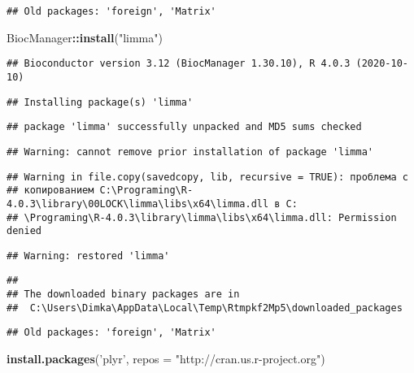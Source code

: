 \documentclass[
]{article}
\newenvironment{Shaded}{\begin{snugshade}}{\end{snugshade}}
\newcommand{\DataTypeTok}[1]{\textcolor[rgb]{0.13,0.29,0.53}{#1}}
\newcommand{\KeywordTok}[1]{\textcolor[rgb]{0.13,0.29,0.53}{\textbf{#1}}}
\newcommand{\NormalTok}[1]{#1}
\newcommand{\OperatorTok}[1]{\textcolor[rgb]{0.81,0.36,0.00}{\textbf{#1}}}
\newcommand{\StringTok}[1]{\textcolor[rgb]{0.31,0.60,0.02}{#1}}
\begin{document}
\begin{verbatim}
## Old packages: 'foreign', 'Matrix'
\end{verbatim}

\begin{Shaded}
\begin{Highlighting}[]
\NormalTok{BiocManager}\OperatorTok{::}\KeywordTok{install}\NormalTok{(}\StringTok{"limma"}\NormalTok{)}
\end{Highlighting}
\end{Shaded}

\begin{verbatim}
## Bioconductor version 3.12 (BiocManager 1.30.10), R 4.0.3 (2020-10-10)
\end{verbatim}

\begin{verbatim}
## Installing package(s) 'limma'
\end{verbatim}

\begin{verbatim}
## package 'limma' successfully unpacked and MD5 sums checked
\end{verbatim}

\begin{verbatim}
## Warning: cannot remove prior installation of package 'limma'
\end{verbatim}

\begin{verbatim}
## Warning in file.copy(savedcopy, lib, recursive = TRUE): проблема с
## копированием C:\Programing\R-4.0.3\library\00LOCK\limma\libs\x64\limma.dll в C:
## \Programing\R-4.0.3\library\limma\libs\x64\limma.dll: Permission denied
\end{verbatim}

\begin{verbatim}
## Warning: restored 'limma'
\end{verbatim}

\begin{verbatim}
## 
## The downloaded binary packages are in
##  C:\Users\Dimka\AppData\Local\Temp\Rtmpkf2Mp5\downloaded_packages
\end{verbatim}

\begin{verbatim}
## Old packages: 'foreign', 'Matrix'
\end{verbatim}

\begin{Shaded}
\begin{Highlighting}[]
\KeywordTok{install.packages}\NormalTok{(}\StringTok{'plyr'}\NormalTok{, }\DataTypeTok{repos =} \StringTok{"http://cran.us.r-project.org"}\NormalTok{)}
\end{Highlighting}
\end{Shaded}
\end{document}

